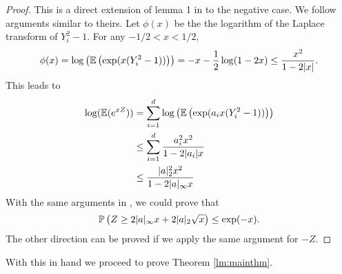 \begin{proof}
	This is a direct extension of lemma 1 in \cite{laurent2000adaptive} to the negative case. We follow arguments similar to theirs.
	Let $\phi(x)$ be the  the logarithm of the Laplace transform of $Y_i^2-1$. For any $-1/2<x<1/2$,
	$$
	\phi(x)=\log\left(\mathbb{E}\left(\exp(x(Y_i^2-1))\right)\right)=-x-{1\over 2}\log(1-2x)\le {x^2\over 1-2|x|}.
	$$
	This leads to
	\begin{align*}
	\log(\mathbb{E}(e^{xZ}))&=\sum_{i=1}^d \log\left(\mathbb{E}\left(\exp(a_ix(Y_i^2-1))\right)\right)\\
	&\le \sum_{i=1}^d {a_i^2x^2\over 1-2|a_i|x}\\
	&\le {|a|_2^2x^2\over 1-2|a|_\infty x}
	\end{align*}
	With the same arguments in \cite{laurent2000adaptive}, we could prove that 
	$$
	\mathbb{P}\left(Z\ge 2|a|_\infty x+2|a|_2\sqrt{x}\right)\le \exp(-x).
	$$
	The other direction can be proved if we apply the same argument for $-Z$.
\end{proof}

With this in hand we proceed to prove Theorem \ref{lm:mainthm}.
	


